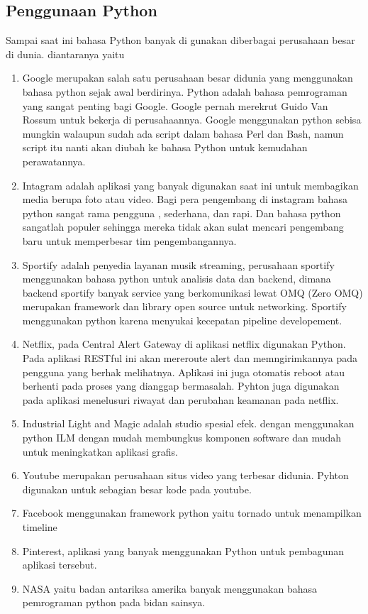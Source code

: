 \subsection{Penggunaan Python}
Sampai saat ini bahasa Python banyak di gunakan diberbagai perusahaan besar di dunia. diantaranya yaitu
\begin{enumerate}
\item Google merupakan salah satu perusahaan besar didunia yang menggunakan bahasa python sejak awal berdirinya. Python adalah bahasa pemrograman yang sangat penting bagi Google. Google pernah merekrut Guido Van Rossum untuk bekerja di perusahaannya. Google menggunakan python sebisa mungkin walaupun sudah ada script dalam bahasa Perl dan Bash, namun script itu nanti akan diubah ke bahasa Python untuk kemudahan perawatannya.
\item Intagram adalah aplikasi yang banyak digunakan saat ini untuk membagikan media berupa foto atau video. Bagi pera pengembang di instagram bahasa python sangat rama pengguna , sederhana, dan rapi. Dan bahasa python sangatlah populer sehingga mereka tidak akan sulat mencari pengembang baru untuk memperbesar tim pengembangannya.
\item Sportify adalah penyedia layanan musik streaming, perusahaan sportify menggunakan bahasa python untuk analisis data dan backend, dimana backend sportify banyak service yang berkomunikasi lewat OMQ (Zero OMQ) merupakan framework dan library open source untuk networking. Sportify menggunakan python karena menyukai kecepatan pipeline developement.
\item Netflix, pada Central Alert Gateway di aplikasi netflix digunakan Python. Pada aplikasi RESTful ini akan mereroute alert dan memngirimkannya pada pengguna yang berhak melihatnya. Aplikasi ini juga otomatis reboot atau berhenti pada proses yang dianggap bermasalah. Pyhton juga digunakan pada aplikasi menelusuri riwayat dan perubahan keamanan pada netflix.
\item Industrial Light and Magic adalah studio spesial efek. dengan menggunakan python ILM dengan mudah membungkus komponen software dan mudah untuk meningkatkan aplikasi grafis.
\item Youtube merupakan perusahaan situs video yang terbesar didunia. Pyhton digunakan untuk sebagian besar kode pada youtube.
\item Facebook menggunakan framework python yaitu tornado untuk menampilkan timeline\
\item Pinterest, aplikasi yang banyak menggunakan Python untuk pembagunan aplikasi tersebut.
\item NASA yaitu badan antariksa amerika banyak menggunakan bahasa pemrograman python pada bidan sainsya.
\end{enumerate}
